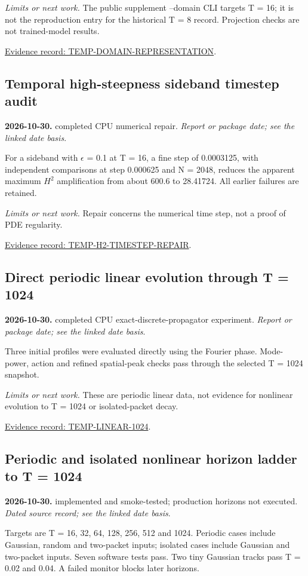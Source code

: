\documentclass[11pt]{article}
\begin{document}
\noindent\textit{Limits or next work.} The public supplement --domain CLI targets T = 16; it is not the reproduction entry for the historical T = 8 record. Projection checks are not trained-model results.

\noindent\href{https://github.com/matasvai/dysthe-paper/blob/codex/research-record-2026-11-05/research-record/2026-11-05/README.md#temp-domain-representation}{Evidence record: TEMP-DOMAIN-REPRESENTATION}.
\subsection*{Temporal high-steepness sideband timestep audit}
\noindent\textbf{2026-10-30.} completed CPU numerical repair. \emph{Report or package date; see the linked date basis}.\par
For a sideband with $\epsilon$ = 0.1 at T = 16, a fine step of 0.0003125, with independent comparisons at step 0.000625 and N = 2048, reduces the apparent maximum $H^2$ amplification from about 600.6 to 28.41724. All earlier failures are retained.

\noindent\textit{Limits or next work.} Repair concerns the numerical time step, not a proof of PDE regularity.

\noindent\href{https://github.com/matasvai/dysthe-paper/blob/codex/research-record-2026-11-05/research-record/2026-11-05/README.md#temp-h2-timestep-repair}{Evidence record: TEMP-H2-TIMESTEP-REPAIR}.
\subsection*{Direct periodic linear evolution through T = 1024}
\noindent\textbf{2026-10-30.} completed CPU exact-discrete-propagator experiment. \emph{Report or package date; see the linked date basis}.\par
Three initial profiles were evaluated directly using the Fourier phase. Mode-power, action and refined spatial-peak checks pass through the selected T = 1024 snapshot.

\noindent\textit{Limits or next work.} These are periodic linear data, not evidence for nonlinear evolution to T = 1024 or isolated-packet decay.

\noindent\href{https://github.com/matasvai/dysthe-paper/blob/codex/research-record-2026-11-05/research-record/2026-11-05/README.md#temp-linear-1024}{Evidence record: TEMP-LINEAR-1024}.
\subsection*{Periodic and isolated nonlinear horizon ladder to T = 1024}
\noindent\textbf{2026-10-30.} implemented and smoke-tested; production horizons not executed. \emph{Dated source record; see the linked date basis}.\par
Targets are T = 16, 32, 64, 128, 256, 512 and 1024. Periodic cases include Gaussian, random and two-packet inputs; isolated cases include Gaussian and two-packet inputs. Seven software tests pass. Two tiny Gaussian tracks pass T = 0.02 and 0.04. A failed monitor blocks later horizons.
\end{document}
